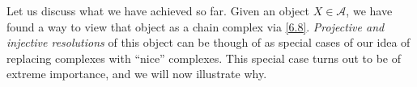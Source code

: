Let us discuss what we have achieved so far. Given an object $X\in \mathcal{A} $, we have found a way to view that object as a chain complex via \cref{6.8}. \emph{Projective and injective resolutions} of this object can be though of as special cases of our idea of replacing complexes with ``nice'' complexes. This special case turns out to be of extreme importance, and we will now illustrate why.
